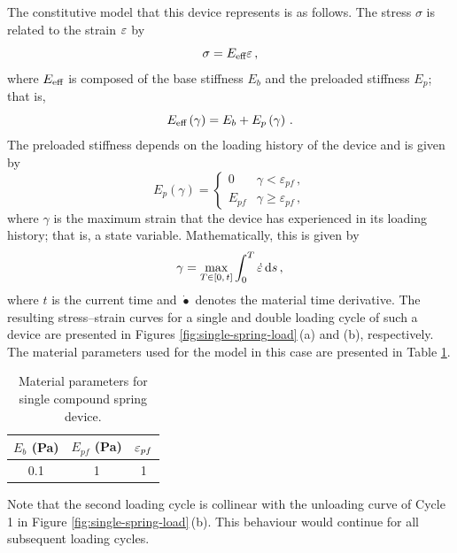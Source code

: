 \documentclass{article}
\begin{document}
The constitutive model that this device represents is as follows. The stress $\sigma$ is related to the strain $\varepsilon$ by
\begin{equation}
	\sigma = E_{\text{eff}} \varepsilon\,,
	\label{eq:stress-start}
\end{equation}
where $E_{\text{eff}}$ is composed of the base stiffness $E_b$ and the preloaded stiffness $E_p$; that is,
\begin{equation}
	E_{\text{eff}}\left(\gamma\right) = E_b + E_p\left(\gamma\right)\,.
	\label{eq:Eeff}
\end{equation}
The preloaded stiffness depends on the loading history of the device and is given by
\begin{equation}
	E_p\left(\gamma\right) = \begin{cases}
		0 & \gamma < \varepsilon_{pf}\,, \\
		E_{pf} & \gamma \geq \varepsilon_{pf}\,,
	\end{cases}
\end{equation}
where $\gamma$ is the maximum strain that the device has experienced in its loading history; that is, a state variable. Mathematically, this is given by
\begin{equation}
	\gamma = \max_{T\in[0, \,t]} \int^{T}_{0} \dot{\varepsilon} \,\text{d} s \,,
		\label{eq:stress-end}
\end{equation}
where $t$ is the current time and $\dot{\bullet}$ denotes the material time derivative. The resulting stress--strain curves for a single and double loading cycle of such a device are presented in Figures \ref{fig:single-spring-load}\,(a) and (b), respectively.
The material parameters used for the model in this case are presented in Table \ref{tab:singl-params}.
\begin{table}
	\centering
	\caption{Material parameters for single compound spring device.}
	\label{tab:singl-params}
	\begin{tabular}{c| c| c}
		$E_b$ (Pa)& $E_{pf}$  (Pa)& $\varepsilon_{pf}$ \\
		\hline \hline
		0.1 & 1 & 1
	\end{tabular}
\end{table}
Note that the second loading cycle is collinear with the unloading curve of Cycle 1 in Figure \ref{fig:single-spring-load}\,(b). This behaviour would continue for all subsequent loading cycles.
\end{document}
